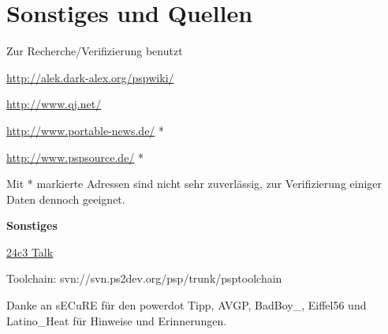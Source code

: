 \documentclass[mode=print,paper=screen,size=10pt,style=paintings]{powerdot}
\begin{document}
\section{Sonstiges und Quellen}
\begin{slide}{Zur Recherche/Verifizierung benutzt}
	\begin{list}{-}{}
		\item{\url{http://alek.dark-alex.org/pspwiki/}}
		\item{\url{http://www.qj.net/}}
		\item{\url{http://www.portable-news.de/} *}
		\item{\url{http://www.pspsource.de/} *}
	\end{list}
	Mit * markierte Adressen sind nicht sehr zuverlässig, zur Verifizierung einiger Daten dennoch geeignet.\linebreak
	\linebreak\linebreak
	\begin{large}\textbf{Sonstiges}\end{large}
	\begin{list}{-}{}
		\item{\href{http://dewy.fem.tu-ilmenau.de/CCC/24C3/matroska/24c3-2209-en-playstation_portable_cracking.mkv}{24c3 Talk}}
		\item{Toolchain: svn://svn.ps2dev.org/psp/trunk/psptoolchain}
	\end{list}
	Danke an sECuRE für den powerdot Tipp, AVGP, BadBoy\_, Eiffel56 und Latino\_Heat für Hinweise und Erinnerungen.
\end{slide}
\end{document}
